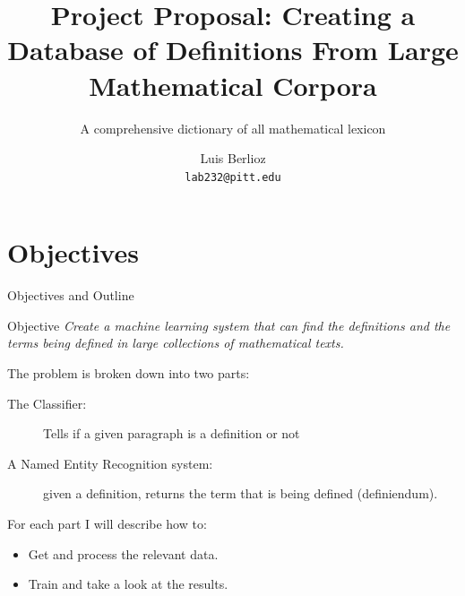 \documentclass[10pt]{beamer}
\title{Project Proposal: Creating a Database of Definitions From Large Mathematical Corpora}
\subtitle{A comprehensive dictionary of all mathematical lexicon}
\author{Luis Berlioz\\
\texttt{lab232@pitt.edu}}
\institute{University of Pittsburgh}
\begin{document}
\begin{frame}
\titlepage
\end{frame}
\section{Objectives}

\begin{frame}{Objectives and Outline}
    \begin{block}{Objective}
    \textit{Create a machine learning system that can find the definitions and the terms being defined in large collections of mathematical texts. }
    \end{block}


    The problem is broken down into two parts:
\begin{description}
    \item[The Classifier:] Tells if a given paragraph is a definition or not
    \item[A Named Entity Recognition system:] given a definition, returns the term that is being defined (definiendum).
\end{description}
For each part I will describe how to:
        \begin{itemize}
                \item Get and process the relevant  data.
                \item Train and take a look at the results.
        \end{itemize}
\end{frame}
\end{document}
